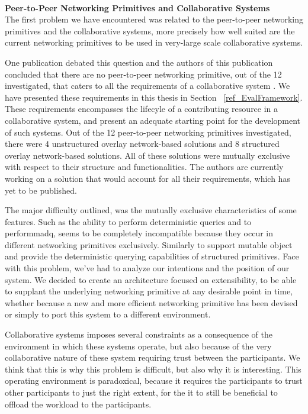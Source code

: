 \documentclass[12pt, titlepage]{uo_temp}
\begin{document}
     \\ \textbf{Peer-to-Peer Networking Primitives and Collaborative Systems}\\
     The first problem we have encountered was related to the peer-to-peer networking
     primitives and the collaborative systems, more precisely how well suited are the current
     networking primitives to be used in very-large scale collaborative systems. 

     One publication debated this question and the authors of this publication concluded
     that there are no peer-to-peer networking primitive, out of the 12 investigated, that
     caters to all the requirements of a collaborative system \cite{p2pcollab}. We have
     presented these requirements in this thesis in Section ~\ref{ref_EvalFramework}.
     These requirements encompasses the lifecyle of a contributing resource in a
     collaborative system, and present an adequate starting point for the development of
     such systems. Out of the 12 peer-to-peer networking primitives investigated, there
     were 4 unstructured overlay network-based solutions and 8 structured overlay
     network-based solutions. All of these solutions were mutually exclusive with respect
     to their structure and functionalities. The authors are currently working on a
     solution that would account for all their requirements, which has yet to be
     published.

     The major difficulty outlined, was the mutually exclusive characteristics of some
     features. Such as the ability to perform deterministic queries and to
     perform\gls{madq}, seems to be completely incompatible because they occur in
     different networking primitives exclusively. Similarly to support mutable object and
     provide the deterministic querying capabilities of structured primitives.  Face with
     this problem, we've had to analyze our intentions and the position of our system. We
     decided to create an architecture focused on extensibility, to be able to supplant
     the underlying networking primitive at any desirable point in time, whether because a
     new and more efficient networking primitive has been devised or simply to port this
     system to a different environment.
     
     Collaborative systems imposes several constraints as a consequence of the environment
     in which these systems operate, but also because of the very collaborative nature of
     these system requiring trust between the participants. We think that this is why this
     problem is difficult, but also why it is interesting. This operating environment is
     paradoxical, because it requires the participants to trust other participants to just
     the right extent, for the it to still be beneficial to offload the workload to the
     participants.
     
\end{document}
